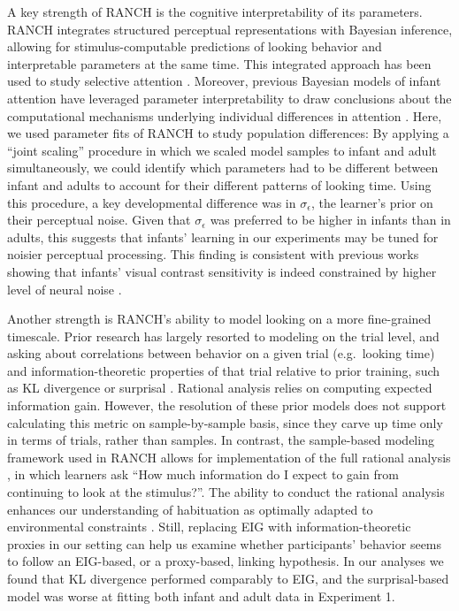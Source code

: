 \documentclass[
]{article}
\begin{document}
A key strength of RANCH is the cognitive interpretability of its parameters. RANCH integrates structured perceptual representations with Bayesian inference, allowing for stimulus-computable predictions of looking behavior and interpretable parameters at the same time. This integrated approach has been used to study selective attention \autocite{blakeman2022selective}. Moreover, previous Bayesian models of infant attention have leveraged parameter interpretability to draw conclusions about the computational mechanisms underlying individual differences in attention \autocite{poli2024individual}. Here, we used parameter fits of RANCH to study population differences: By applying a ``joint scaling'' procedure in which we scaled model samples to infant and adult simultaneously, we could identify which parameters had to be different between infant and adults to account for their different patterns of looking time. Using this procedure, a key developmental difference was in \(\sigma_{\epsilon}\), the learner's prior on their perceptual noise. Given that \(\sigma_{\epsilon}\) was preferred to be higher in infants than in adults, this suggests that infants' learning in our experiments may be tuned for noisier perceptual processing. This finding is consistent with previous works showing that infants' visual contrast sensitivity is indeed constrained by higher level of neural noise \autocite{skoczenski1998neural, johnson2010infants}.

Another strength is RANCH's ability to model looking on a more fine-grained timescale. Prior research has largely resorted to modeling on the trial level, and asking about correlations between behavior on a given trial (e.g.~looking time) and information-theoretic properties of that trial relative to prior training, such as KL divergence or surprisal \autocite{kidd2012goldilocks,poli2023eight}. Rational analysis relies on computing expected information gain. However, the resolution of these prior models does not support calculating this metric on sample-by-sample basis, since they carve up time only in terms of trials, rather than samples. In contrast, the sample-based modeling framework used in RANCH allows for implementation of the full rational analysis \autocite{oaksford1994rational,anderson1991human}, in which learners ask ``How much information do I expect to gain from continuing to look at the stimulus?''. The ability to conduct the rational analysis enhances our understanding of habituation as optimally adapted to environmental constraints \autocite[see e.g.][for a different rational analysis of habituation]{gershman2024habituation}. Still, replacing EIG with information-theoretic proxies in our setting can help us examine whether participants' behavior seems to follow an EIG-based, or a proxy-based, linking hypothesis. In our analyses we found that KL divergence performed comparably to EIG, and the surprisal-based model was worse at fitting both infant and adult data in Experiment 1.
\end{document}
